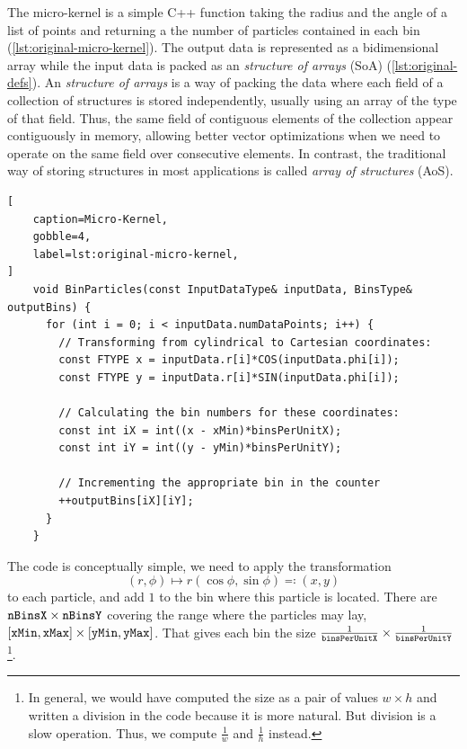 \documentclass[
    12pt, %
]{fphw}
\newcommand{\mtech}[1]{\text{\texttt{#1}}}
\begin{document}
    The micro-kernel is a simple C++ function taking the radius and the angle of
a list of points and returning a the number of particles contained in each bin
(\cref{lst:original-micro-kernel}).
The output data is represented as a bidimensional array while
the input data is packed as an \textit{structure of arrays} (SoA)
(\cref{lst:original-defs}).
An \textit{structure of arrays} is a way of packing the data where
each field of a collection of structures is stored independently,
usually using an array of the type of that field.
Thus, the same field of contiguous elements of the collection
appear contiguously in memory,
allowing better vector optimizations when we need to operate
on the same field over consecutive elements.
In contrast, the traditional way of storing structures in most applications
is called \textit{array of structures} (AoS).

\begin{lstlisting}[
    caption=Micro-Kernel,
    gobble=4,
    label=lst:original-micro-kernel,
]
    void BinParticles(const InputDataType& inputData, BinsType& outputBins) {
      for (int i = 0; i < inputData.numDataPoints; i++) { 
        // Transforming from cylindrical to Cartesian coordinates:
        const FTYPE x = inputData.r[i]*COS(inputData.phi[i]);
        const FTYPE y = inputData.r[i]*SIN(inputData.phi[i]);

        // Calculating the bin numbers for these coordinates:
        const int iX = int((x - xMin)*binsPerUnitX);
        const int iY = int((y - yMin)*binsPerUnitY);

        // Incrementing the appropriate bin in the counter
        ++outputBins[iX][iY];
      }
    }

\end{lstlisting}

    The code is conceptually simple, we need to apply the transformation
\begin{equation*}
    (r, \phi) \mapsto r(\cos{\phi}, \sin{\phi}) \eqqcolon (x, y)
\end{equation*}
%
to each particle,
and add $1$ to the bin where this particle is located.
There are $\mtech{nBinsX} \times \mtech{nBinsY}$
covering the range where the particles may lay,
$[\mtech{xMin}, \mtech{xMax}] \times [\mtech{yMin}, \mtech{yMax}]$.
That gives each bin the size
$\frac{1}{\mtech{binsPerUnitX}} \times \frac{1}{\mtech{binsPerUnitY}}$\footnote{
    In general, we would have computed the size as a pair of values $w \times h$
    and written a division in the code because it is more natural.
    But division is a slow operation.
    Thus, we compute $\frac{1}{w}$ and $\frac{1}{h}$ instead.
}.
\end{document}

